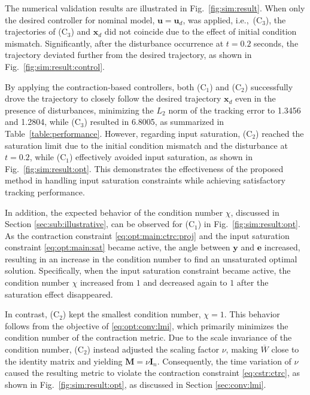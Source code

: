 \documentclass{ifacconf}
\newcommand\ie{\textrm{i.e.,\ }}
\newcommand{\oneErr}{{1.3456}}
\newcommand{\twoErr}{{1.2804}}
\newcommand{\threeErr}{{6.8005}}
\newcommand*{\mv}[1]{\boldsymbol{#1}} %
\newcommand*{\mm}[1]{\boldsymbol{#1}} %
\begin{document}
The numerical validation results are illustrated in Fig.~\ref{fig:sim:result}.
When only the desired controller for nominal model, $\mv{u}=\mv{u}_d$, was applied, \ie (C$_3$), the trajectories of (C$_3$) and $\mv{x}_d$ did not coincide due to the effect of initial condition mismatch.
Significantly, after the disturbance occurrence at $t=0.2$ seconds, the trajectory deviated further from the desired trajectory, as shown in Fig.~\ref{fig:sim:result:control}.

By applying the contraction-based controllers, both (C$_1$) and (C$_2$) successfully drove the trajectory to closely follow the desired trajectory $\mv{x}_d$ even in the presence of disturbances, minimizing the $L_2$ norm of the tracking error to {\oneErr} and {\twoErr}, while (C$_3$) resulted in {\threeErr}, as summarized in Table~\ref{table:performance}.
However, regarding input saturation, (C$_2$) reached the saturation limit due to the initial condition mismatch and the disturbance at $t=0.2$, while (C$_1$) effectively avoided input saturation, as shown in Fig.~\ref{fig:sim:result:opt}.
This demonstrates the effectiveness of the proposed method in handling input saturation constraints while achieving satisfactory tracking performance.

In addition, the expected behavior of the condition number $\chi$, discussed in Section \ref{sec:sub:illustrative}, can be observed for (C$_1$) in Fig.~\ref{fig:sim:result:opt}.
As the contraction constraint \eqref{eq:opt:main:ctrc:proj} and the input saturation constraint \eqref{eq:opt:main:sat} became active, the angle between $\mv{y}$ and $\mv{e}$ increased, resulting in an increase in the condition number to find an unsaturated optimal solution.
Specifically, when the input saturation constraint became active, the condition number $\chi$ increased from $1$ and decreased again to $1$ after the saturation effect disappeared.

In contrast, (C$_2$) kept the smallest condition number, $\chi=1$.
This behavior follows from the objective of \eqref{eq:opt:conv:lmi}, which primarily minimizes the condition number of the contraction metric.
Due to the scale invariance of the condition number, (C$_2$) instead adjusted the scaling factor $\nu$, making $\overline W$ close to the identity matrix and yielding $\mm M=\nu\mm I_n$.
Consequently, the time variation of $\nu$ caused the resulting metric to violate the contraction constraint \eqref{eq:cstr:ctrc}, as shown in Fig.~\ref{fig:sim:result:opt}, as discussed in Section \ref{sec:conv:lmi}.
\end{document}
